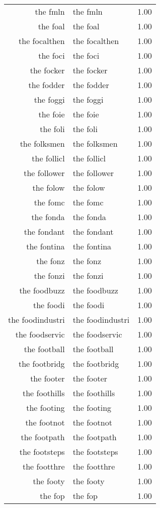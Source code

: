 \begin{table}[ht]
\begin{tabular}{rlr}
  the fmln & the fmln & 1.00 \\ 
  the foal & the foal & 1.00 \\ 
  the focalthen & the focalthen & 1.00 \\ 
  the foci & the foci & 1.00 \\ 
  the focker & the focker & 1.00 \\ 
  the fodder & the fodder & 1.00 \\ 
  the foggi & the foggi & 1.00 \\ 
  the foie & the foie & 1.00 \\ 
  the foli & the foli & 1.00 \\ 
  the folksmen & the folksmen & 1.00 \\ 
  the follicl & the follicl & 1.00 \\ 
  the follower & the follower & 1.00 \\ 
  the folow & the folow & 1.00 \\ 
  the fomc & the fomc & 1.00 \\ 
  the fonda & the fonda & 1.00 \\ 
  the fondant & the fondant & 1.00 \\ 
  the fontina & the fontina & 1.00 \\ 
  the fonz & the fonz & 1.00 \\ 
  the fonzi & the fonzi & 1.00 \\ 
  the foodbuzz & the foodbuzz & 1.00 \\ 
  the foodi & the foodi & 1.00 \\ 
  the foodindustri & the foodindustri & 1.00 \\ 
  the foodservic & the foodservic & 1.00 \\ 
  the football & the football & 1.00 \\ 
  the footbridg & the footbridg & 1.00 \\ 
  the footer & the footer & 1.00 \\ 
  the foothills & the foothills & 1.00 \\ 
  the footing & the footing & 1.00 \\ 
  the footnot & the footnot & 1.00 \\ 
  the footpath & the footpath & 1.00 \\ 
  the footsteps & the footsteps & 1.00 \\ 
  the footthre & the footthre & 1.00 \\ 
  the footy & the footy & 1.00 \\ 
  the fop & the fop & 1.00 \\ 

\end{tabular}
\end{table}
